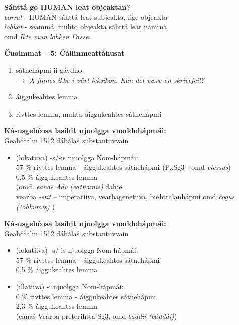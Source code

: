 \documentclass[landscape,norsk,11pt]{seminar}
\begin{document}
\begin{slide}
\newslide
\textbf{Sáhttá go HUMAN leat objeaktan?} \\

 \textit{borrat}   - HUMAN sáhttá leat subjeakta, iige objeakta \\
 
  \textit{lohkat}  - seammá, muhto objeakta sáhttá leat namma, \\ omd   \textit{Ikte mun lohken Fosse.}

\newslide
\textbf{Čuolmmat -- 5: Čállinmeattáhusat} \\
\begin{enumerate}
\item sátnehápmi ii gávdno: \\ \textit{$\rightarrow$ X finnes ikke i vårt leksikon. Kan det være en skrivefeil?}
\item áiggukeahtes lemma
\item rivttes lemma, muhto áiggukeahtes sátnehápmi
\end{enumerate}

\newslide
\textbf{Kásusgehčosa lasihit njuolgga vuođđohápmái:} \\
Geahččalin 1512 dábálaš substantiivvain 
\begin{itemize}
\item (lokatiiva) -s/-is njuolgga Nom-hápmái: \\
57 \% rivttes lemma - áiggukeahtes sátnehápmi (PxSg3 - omd \textit{viessus})  \\  0,5 \% áiggukeahtes lemma \\  (omd. \textit{eanas Adv (eatnamis)}  dahje \\ vearba \textit{-stit} -- imperatiiva, vearbagenetiiva, biehttalanhápmi omd \textit{čogus (čohkumis)} )
\end{itemize}

\newslide
\textbf{Kásusgehčosa lasihit njuolgga vuođđohápmái:} \\
Geahččalin 1512 dábálaš substantiivvain 
\begin{itemize}
\item (lokatiiva) -s/-is njuolgga Nom-hápmái: \\
57 \% rivttes lemma - áiggukeahtes sátnehápmi \\  
0,5 \% áiggukeahtes lemma \\
\item (illatiiva) -i njuolgga Nom-hápmái: \\
0 \% rivttes lemma - áiggukeahtes sátnehápmi \\  2,3 \% áiggukeahtes lemma \\ (eanaš Vearba preterihtta Sg3, omd \textit{báddii (báddái)}) 
\end{itemize}


\end{slide}
\end{document}
